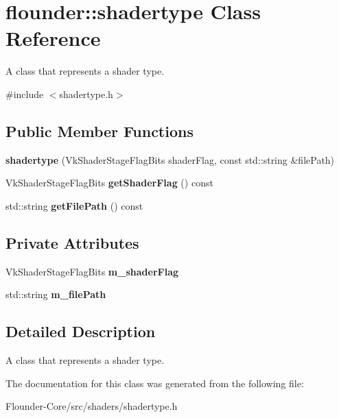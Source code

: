\hypertarget{classflounder_1_1shadertype}{}\section{flounder\+:\+:shadertype Class Reference}
\label{classflounder_1_1shadertype}


A class that represents a shader type.  




{\ttfamily \#include $<$shadertype.\+h$>$}

\subsection*{Public Member Functions}
\begin{DoxyCompactItemize}
\item 
\mbox{\label{classflounder_1_1shadertype_ae3189f83b2500639239b932435538457}} 
{\bfseries shadertype} (Vk\+Shader\+Stage\+Flag\+Bits shader\+Flag, const std\+::string \&file\+Path)
\item 
\mbox{\label{classflounder_1_1shadertype_a05303530b011a26ce5ee56c7e852aaf4}} 
Vk\+Shader\+Stage\+Flag\+Bits {\bfseries get\+Shader\+Flag} () const
\item 
\mbox{\label{classflounder_1_1shadertype_abd859b871f8e09ef93e235d3b0b48c3c}} 
std\+::string {\bfseries get\+File\+Path} () const
\end{DoxyCompactItemize}
\subsection*{Private Attributes}
\begin{DoxyCompactItemize}
\item 
\mbox{\label{classflounder_1_1shadertype_ad4a87fc235aa883734f9941c381e2b7d}} 
Vk\+Shader\+Stage\+Flag\+Bits {\bfseries m\+\_\+shader\+Flag}
\item 
\mbox{\label{classflounder_1_1shadertype_a774f69870b071d3ad015a624942f3f7e}} 
std\+::string {\bfseries m\+\_\+file\+Path}
\end{DoxyCompactItemize}


\subsection{Detailed Description}
A class that represents a shader type. 



The documentation for this class was generated from the following file\+:\begin{DoxyCompactItemize}
\item 
Flounder-\/\+Core/src/shaders/shadertype.\+h\end{DoxyCompactItemize}
